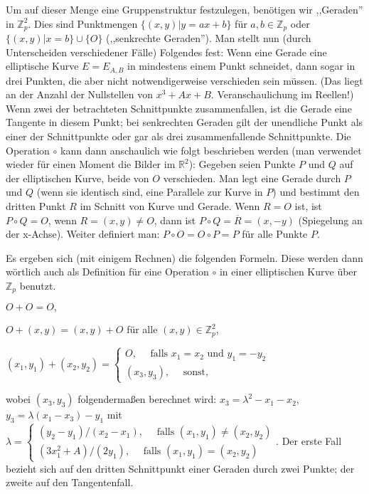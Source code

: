 \documentclass[a4paper]{article}
\begin{document}
\begin{multicols}{3}
    Um auf dieser Menge eine Gruppenstruktur festzulegen, benötigen wir ,,Geraden'' in $\mathbb{Z}^2_p$. Dies sind Punktmengen $\{(x,y)|y=ax+b\}$ für $a,b\in\mathbb{Z}_p$ oder $\{(x,y)|x=b\}\cup\{O\}$ (,,senkrechte Geraden''). Man stellt nun (durch Unterscheiden verschiedener Fälle) Folgendes fest: Wenn eine Gerade eine elliptische Kurve $E=E_{A,B}$ in mindestens einem Punkt schneidet, dann sogar in drei Punkten, die aber nicht notwendigerweise verschieden sein müssen. (Das liegt an der Anzahl der Nullstellen von $x^3+Ax+B$. Veranschaulichung im Reellen!)
    Wenn zwei der betrachteten Schnittpunkte zusammenfallen, ist die Gerade eine Tangente in diesem Punkt; bei senkrechten Geraden gilt der unendliche Punkt als einer der Schnittpunkte oder gar als drei zusammenfallende Schnittpunkte.
    Die Operation $\circ$ kann dann anschaulich wie folgt beschrieben werden (man verwendet wieder für einen Moment die Bilder im $\mathbb{R}^2$): Gegeben seien Punkte $P$ und $Q$ auf der elliptischen Kurve, beide von $O$ verschieden. Man legt eine Gerade durch $P$ und $Q$ (wenn sie identisch sind, eine Parallele zur Kurve in $P$) und bestimmt den dritten Punkt $R$ im Schnitt von Kurve und Gerade. Wenn $R=O$ ist, ist $P\circ Q=O$, wenn $R= (x,y)\not=O$, dann ist $P\circ Q=\overline{R}= (x,-y)$ (Spiegelung an der x-Achse).
    Weiter definiert man: $P\circ O=O\circ P=P$ für alle Punkte $P$.

    Es ergeben sich (mit einigem Rechnen) die folgenden Formeln. Diese werden dann wörtlich auch als Definition für eine Operation $\circ$ in einer elliptischen Kurve über $\mathbb{Z}_p$ benutzt.
    \begin{itemize*}
        \item $O+O=O,$
        \item $O+ (x,y) = (x,y) +O$ für alle $(x,y)\in\mathbb{Z}^2_p$,
        \item $(x_1,y_1) + (x_2,y_2) =\begin{cases} O,\quad\text{ falls } x_1=x_2 \text{ und } y_1=-y_2 \\ (x_3,y_3),\quad\text{ sonst,}\end{cases}$
    \end{itemize*}

    wobei $(x_3,y_3)$ folgendermaßen berechnet wird: $x_3=\lambda^2-x_1-x_2$, $y_3=\lambda(x_1-x_3)-y_1$ mit $\lambda=\begin{cases} (y_2-y_1)/(x_2-x_1),\quad\text{ falls } (x_1,y_1)\not= (x_2,y_2)\\ (3x^2_1+A)/(2y_1),\quad\text{ falls } (x_1,y_1) = (x_2,y_2)\end{cases}$.
    Der erste Fall bezieht sich auf den dritten Schnittpunkt einer Geraden durch zwei Punkte; der zweite auf den Tangentenfall.


\end{multicols}
\end{document}

